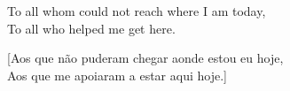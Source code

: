 To all whom could not reach where I am today,\\
To all who helped me get here.

\vspace*{12pt}

[Aos que não puderam chegar aonde estou eu hoje,\\
Aos que me apoiaram a estar aqui hoje.]
